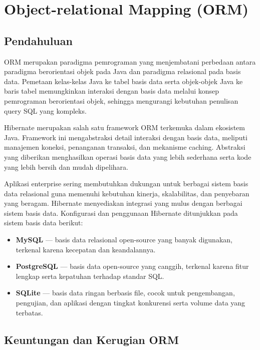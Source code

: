 \chapter{Object-relational Mapping (ORM)}

\section{Pendahuluan}

ORM merupakan paradigma pemrograman yang menjembatani perbedaan antara paradigma berorientasi objek pada Java dan paradigma relasional pada basis data. Pemetaan kelas-kelas Java ke tabel basis data serta objek-objek Java ke baris tabel memungkinkan interaksi dengan basis data melalui konsep pemrograman berorientasi objek, sehingga mengurangi kebutuhan penulisan query SQL yang kompleks.

Hibernate merupakan salah satu framework ORM terkemuka dalam ekosistem Java. Framework ini mengabstraksi detail interaksi dengan basis data, meliputi manajemen koneksi, penanganan transaksi, dan mekanisme caching. Abstraksi yang diberikan menghasilkan operasi basis data yang lebih sederhana serta kode yang lebih bersih dan mudah dipelihara.

Aplikasi enterprise sering membutuhkan dukungan untuk berbagai sistem basis data relasional guna memenuhi kebutuhan kinerja, skalabilitas, dan penyebaran yang beragam. Hibernate menyediakan integrasi yang mulus dengan berbagai sistem basis data. Konfigurasi dan penggunaan Hibernate ditunjukkan pada sistem basis data berikut:
\begin{itemize}
	\item \textbf{MySQL} --- basis data relasional open-source yang banyak digunakan, terkenal karena kecepatan dan keandalannya.
	\item \textbf{PostgreSQL} --- basis data open-source yang canggih, terkenal karena fitur lengkap serta kepatuhan terhadap standar SQL.
	\item \textbf{SQLite} --- basis data ringan berbasis file, cocok untuk pengembangan, pengujian, dan aplikasi dengan tingkat konkurensi serta volume data yang terbatas.
\end{itemize}




\section{Keuntungan dan Kerugian ORM}

